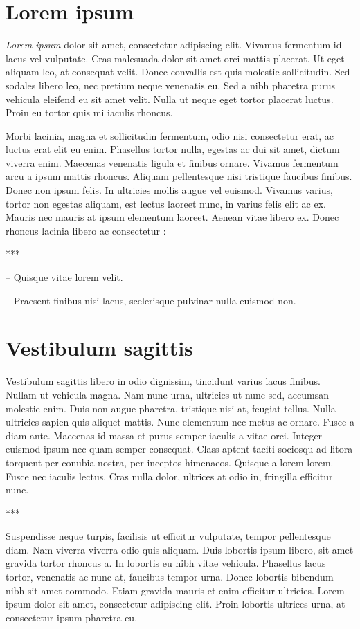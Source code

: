 \documentclass{book}
\begin{document}
\chapter{Lorem ipsum}

\emph{Lorem ipsum} dolor sit amet, consectetur adipiscing elit. Vivamus fermentum id lacus vel vulputate. Cras malesuada dolor sit amet orci mattis placerat. Ut eget aliquam leo, at consequat velit. Donec convallis est quis molestie sollicitudin. Sed sodales libero leo, nec pretium neque venenatis eu. Sed a nibh pharetra purus vehicula eleifend eu sit amet velit. Nulla ut neque eget tortor placerat luctus. Proin eu tortor quis mi iaculis rhoncus.

Morbi lacinia, magna et sollicitudin fermentum, odio nisi consectetur erat, ac luctus erat elit eu enim. Phasellus tortor nulla, egestas ac dui sit amet, dictum viverra enim. Maecenas venenatis ligula et finibus ornare. Vivamus fermentum arcu a ipsum mattis rhoncus. Aliquam pellentesque nisi tristique faucibus finibus. Donec non ipsum felis. In ultricies mollis augue vel euismod. Vivamus varius, tortor non egestas aliquam, est lectus laoreet nunc, in varius felis elit ac ex. Mauris nec mauris at ipsum elementum laoreet. Aenean vitae libero ex. Donec rhoncus lacinia libero ac consectetur :

\centerline{***}

-- Quisque vitae lorem velit.

-- Praesent finibus nisi lacus, scelerisque pulvinar nulla euismod non.

\chapter{Vestibulum sagittis}

Vestibulum sagittis libero in odio dignissim, tincidunt varius lacus finibus. Nullam ut vehicula magna. Nam nunc urna, ultricies ut nunc sed, accumsan molestie enim. Duis non augue pharetra, tristique nisi at, feugiat tellus. Nulla ultricies sapien quis aliquet mattis. Nunc elementum nec metus ac ornare. Fusce a diam ante. Maecenas id massa et purus semper iaculis a vitae orci. Integer euismod ipsum nec quam semper consequat. Class aptent taciti sociosqu ad litora torquent per conubia nostra, per inceptos himenaeos. Quisque a lorem lorem. Fusce nec iaculis lectus. Cras nulla dolor, ultrices at odio in, fringilla efficitur nunc.

\centerline{***}

Suspendisse neque turpis, facilisis ut efficitur vulputate, tempor pellentesque diam. Nam viverra viverra odio quis aliquam. Duis lobortis ipsum libero, sit amet gravida tortor rhoncus a. In lobortis eu nibh vitae vehicula. Phasellus lacus tortor, venenatis ac nunc at, faucibus tempor urna. Donec lobortis bibendum nibh sit amet commodo. Etiam gravida mauris et enim efficitur ultricies. Lorem ipsum dolor sit amet, consectetur adipiscing elit. Proin lobortis ultrices urna, at consectetur ipsum pharetra eu.
\end{document}
